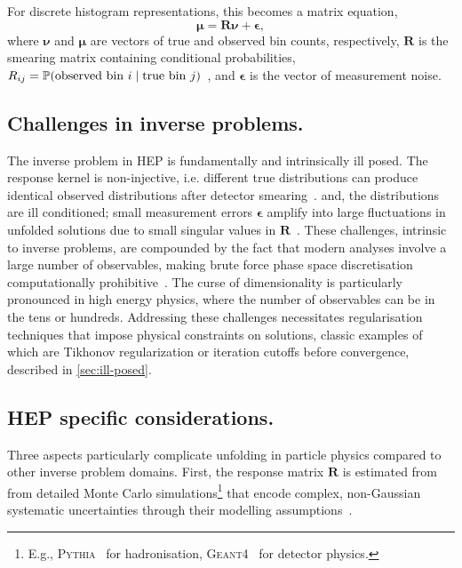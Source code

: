 For discrete histogram representations, this becomes a matrix equation,
\begin{equation}
    \label{eq:forward-binned}
    \boldsymbol{\mu} = \mathbf{R}\boldsymbol{\nu} + \boldsymbol{\epsilon},
\end{equation}
where \(\boldsymbol{\nu}\) and \(\boldsymbol{\mu}\) are vectors of true and observed bin counts, respectively, \(\mathbf{R}\) is the smearing matrix containing conditional probabilities, \(R_{ij} = \P(\text{observed bin } i \mid \text{true bin } j)\)~\cite{cms_collaboration_measurement_2011}, and \(\boldsymbol{\epsilon}\) is the vector of measurement noise.

    \subsection{Challenges in inverse problems.}
        The inverse problem in HEP is fundamentally and intrinsically ill posed.
        The response kernel is non-injective, i.e. different true distributions can produce identical observed distributions after detector smearing~\cite{palumbo_convergence_2025, neumaier_solving_1998, weinberg_elementary_1963}.
        and, the distributions are ill conditioned; small measurement errors \(\boldsymbol{\epsilon}\) amplify into large fluctuations in unfolded solutions due to small singular values in \(\mathbf{R}\)~\cite{ChungA, fernandez-martinez_effect_2014, carpio_inverse_2008}.
        These challenges, intrinsic to inverse problems, are compounded by the fact that modern analyses involve a large number of observables, making brute force phase space discretisation computationally prohibitive~\cite{arratia_optimizing_2022, gaponenko_practical_2020, chan_unbinned_2023}.
        The curse of dimensionality is particularly pronounced in high energy physics, where the number of observables can be in the tens or hundreds.
        Addressing these challenges necessitates regularisation techniques that impose physical constraints on solutions, classic examples of which are Tikhonov regularization or iteration cutoffs before convergence, described in \cref{sec:ill-posed}.

    \subsection{HEP specific considerations.}
        Three aspects particularly complicate unfolding in particle physics compared to other inverse problem domains.
        First, the response matrix \(\mathbf{R}\) is estimated from from detailed Monte Carlo simulations\footnote{E.g., \textsc{Pythia}~\cite{bierlich_comprehensive_2022} for hadronisation, \textsc{Geant4}~\cite{allison_recent_2016} for detector physics.} that encode complex, non-Gaussian systematic uncertainties through their modelling assumptions~\cite{bozson_unfolding_2018, schmitt_data_2017, blobel_unfolding_2011, Huang2025MachineTechnique}.

